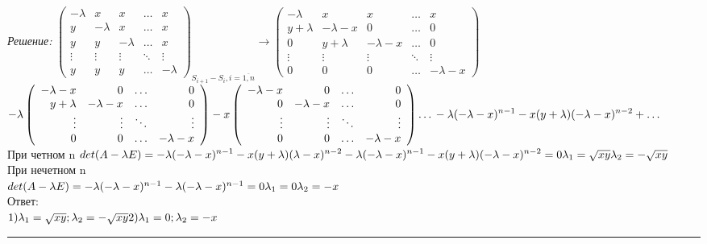 \documentclass[a4paper, 12pt]{article}
\newenvironment{solution}
    {\textit{Решение: }}
    {\noindent\rule{7in}{1.5pt}}
\begin{document}
\begin{solution}
$\displaystyle
\left( 
\begin{array}{rrrrr}
-\lambda & x & x & \ldots & x \\
y & -\lambda & x & \ldots & x \\ 
y & y & -\lambda & \ldots & x \\
\vdots & \vdots & \vdots & \ddots & \vdots \\
y & y & y & \ldots & -\lambda 
\end{array} 
\right)_{S_{i+1} - S_i, i=\overline{1, n}}
\rightarrow
\left( 
\begin{array}{rrrrr}
-\lambda & x & x & \ldots & x \\
y + \lambda & -\lambda - x & 0 & \ldots & 0 \\ 
0 & y + \lambda & -\lambda - x & \ldots & 0 \\
\vdots & \vdots & \vdots & \ddots & \vdots \\
0 & 0 & 0 & \ldots & -\lambda - x
\end{array} 
\right)
$
\\
$\displaystyle
-\lambda
\left( 
\begin{array}{rrrrr}
-\lambda - x & 0 & \ldots & 0 \\ 
y + \lambda & -\lambda - x & \ldots & 0 \\
\vdots & \vdots & \ddots & \vdots \\
0 & 0 & \ldots & -\lambda - x 
\end{array} 
\right)
-x
\left( 
\begin{array}{rrrrr}
-\lambda - x & 0 & \ldots & 0 \\ 
0 & -\lambda - x & \ldots & 0 \\
\vdots & \vdots & \ddots & \vdots \\
0 & 0 & \ldots & -\lambda - x 
\end{array} 
\right)
\ldots\\
-\lambda(-\lambda - x)^{n-1} - x(y + \lambda)(-\lambda - x)^{n-2} + \ldots$
\\
При четном n
$\displaystyle
\\
det(A-\lambda E) = -\lambda(-\lambda - x)^{n-1} - x(y + \lambda)(\lambda - x)^{n-2}
\\
-\lambda(-\lambda - x)^{n-1} - x(y + \lambda)(- \lambda - x)^{n-2} = 0
\\
\lambda_1 = \sqrt{xy}
\\
\lambda_2 = -\sqrt{xy}
$
\\
При нечетном n
\\
$
det(A-\lambda E) = -\lambda(-\lambda - x)^{n-1}
\\
-\lambda(-\lambda - x)^{n-1} = 0
\\
\lambda_1 = 0
\\
\lambda_2 = -x
$
\\
Ответ: 
\\
$1) \lambda_1 = \sqrt{xy}; \lambda_2 = -\sqrt{xy}\\ 2)\lambda_1 = 0; \lambda_2 = -x$

\end{solution}

\end{document}
